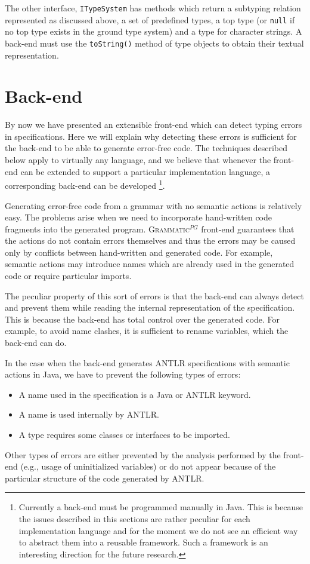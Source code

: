 \documentclass{llncs2e/llncs}
\newcommand{\tool}[1]{\textsc{#1}}
\newcommand{\ATF}{\textsc{Grammatic}$^{PG}$}
\begin{document}
{The other interface, \texttt{ITypeSystem} has methods which return a subtyping relation represented as discussed above, a set of predefined types, a top type (or \texttt{null} if no top type exists in the ground type system) and a type for character strings. A back-end must use the \texttt{toString()} method of type objects to obtain their textual representation.

\section{Back-end}\label{Backend}

By now we have presented an extensible front-end which can detect typing errors in specifications. Here we will explain why detecting these errors is sufficient for the back-end to be able to generate error-free code. The techniques described below apply to virtually any language, and we believe that whenever the front-end can be extended to support a particular implementation language, a corresponding back-end can be developed \footnote{Currently a back-end must be programmed manually in Java. This is because the issues described in this sections are rather peculiar for each implementation language and for the moment we do not see an efficient way to abstract them into a reusable framework. Such a framework is an interesting direction for the future research.}.

Generating error-free code from a grammar with no semantic actions is relatively easy. The problems arise when we need to incorporate hand-written code fragments into the generated program. \ATF{} front-end guarantees that the actions do not contain errors themselves and thus the errors may be caused only by conflicts between hand-written and generated code. For example, semantic actions may introduce names which are already used in the generated code or require particular imports. 

The peculiar property of this sort of errors is that the back-end can always detect and prevent them while reading the internal representation of the specification. This is because the back-end has total control over the generated code. For example, to avoid name clashes, it is sufficient to rename variables, which the back-end can do.

In the case when the back-end generates \tool{ANTLR} specifications with semantic actions in Java, we have to prevent the following types of errors:
\begin{itemize}
	\item A name used in the specification is a Java or ANTLR keyword.
	\item A name is used internally by ANTLR.
	\item A type requires some classes or interfaces to be imported.
\end{itemize}
Other types of errors are either prevented by the analysis performed by the front-end (e.g., usage of uninitialized variables) or do not appear because of the particular structure of the code generated by \tool{ANTLR}.

}
\end{document}
